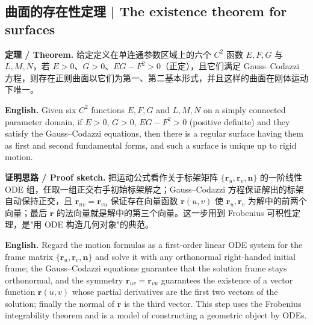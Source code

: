 \documentclass[UTF8,11pt,a4paper]{ctexart}
\newcommand{\EN}[1]{\par\noindent \textbf{English.} #1\par}
\newcommand{\THM}[2]{\par\noindent\textbf{定理 / Theorem.} #1\par\EN{#2}\par\smallskip}
\newcommand{\PROOF}[2]{\par\noindent\textbf{证明思路 / Proof sketch.} #1\par\EN{#2}\par\smallskip}
\newcommand{\br}{\mathbf{r}}
\newcommand{\bn}{\mathbf{n}}
\begin{document}
\subsection{曲面的存在性定理 | The existence theorem for surfaces}
\THM{给定定义在单连通参数区域上的六个 $C^2$ 函数 $E,F,G$ 与 $L,M,N$，若 $E>0$、$G>0$、$EG-F^2>0$（正定），且它们满足 Gauss--Codazzi 方程，则存在正则曲面以它们为第一、第二基本形式，并且这样的曲面在刚体运动下唯一。}{Given six $C^2$ functions $E,F,G$ and $L,M,N$ on a simply connected parameter domain, if $E>0$, $G>0$, $EG-F^2>0$ (positive definite) and they satisfy the Gauss--Codazzi equations, then there is a regular surface having them as first and second fundamental forms, and such a surface is unique up to rigid motion.}
\PROOF{把运动公式看作关于标架矩阵 $\{\br_u,\br_v,\bn\}$ 的一阶线性 ODE 组，任取一组正交右手初始标架解之；Gauss--Codazzi 方程保证解出的标架自动保持正交，且 $\br_{uv}=\br_{vu}$ 保证存在向量函数 $\br(u,v)$ 使 $\br_u,\br_v$ 为解中的前两个向量；最后 $\br$ 的法向量就是解中的第三个向量。这一步用到 Frobenius 可积性定理，是"用 ODE 构造几何对象"的典范。}{Regard the motion formulas as a first-order linear ODE system for the frame matrix $\{\br_u,\br_v,\bn\}$ and solve it with any orthonormal right-handed initial frame; the Gauss--Codazzi equations guarantee that the solution frame stays orthonormal, and the symmetry $\br_{uv}=\br_{vu}$ guarantees the existence of a vector function $\br(u,v)$ whose partial derivatives are the first two vectors of the solution; finally the normal of $\br$ is the third vector. This step uses the Frobenius integrability theorem and is a model of constructing a geometric object by ODEs.}
\end{document}
